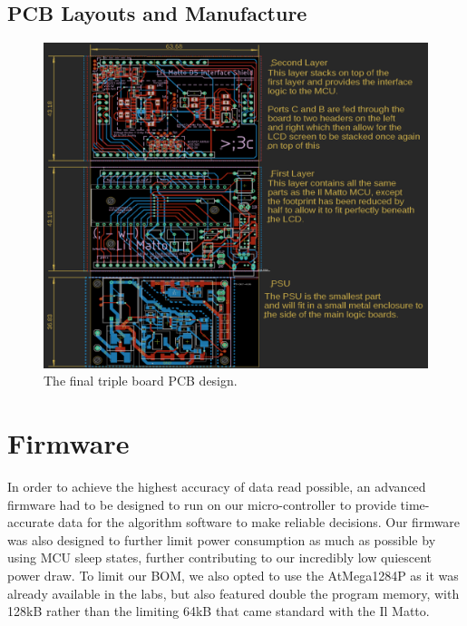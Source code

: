 \documentclass[9pt, technote, a4paper, nofonttune]{IEEEphot}
\begin{document}
        \subsection{PCB Layouts and Manufacture}
        \begin{figure}[h!]
            \centering
             \includegraphics[width=35pc]{D5/PCB layout.png}
            \caption{The final triple board PCB design.}
        \end{figure}


\newpage
 \section{Firmware}
        \hspace{0.5cm}In order to achieve the highest accuracy of data read possible, an advanced firmware had to be designed to run on our micro-controller to provide time-accurate data for the algorithm software to make reliable decisions.  Our firmware was also designed to further limit power consumption as much as possible by using MCU sleep states, further contributing to our incredibly low quiescent power draw.  To limit our BOM, we also opted to use the AtMega1284P as it was already available in the labs, but also featured double the program memory, with 128kB rather than the limiting 64kB that came standard with the Il Matto.
\end{document}
